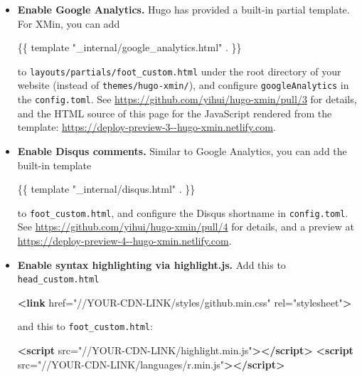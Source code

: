 \documentclass[12pt,]{krantz}
\makeatletter
\newenvironment{Shaded}{\begin{snugshade}}{\end{snugshade}}
\newcommand{\KeywordTok}[1]{\textcolor[rgb]{0.13,0.29,0.53}{\textbf{#1}}}
\newcommand{\StringTok}[1]{\textcolor[rgb]{0.31,0.60,0.02}{#1}}
\newcommand{\OtherTok}[1]{\textcolor[rgb]{0.56,0.35,0.01}{#1}}
\newcommand{\NormalTok}[1]{#1}
\newenvironment{kframe}{%
\medskip{}
\setlength{\fboxsep}{.8em}
 \def\at@end@of@kframe{}%
 \ifinner\ifhmode%
  \def\at@end@of@kframe{\end{minipage}}%
  \begin{minipage}{\columnwidth}%
 \fi\fi%
 \def\FrameCommand##1{\hskip\@totalleftmargin \hskip-\fboxsep
 \colorbox{shadecolor}{##1}\hskip-\fboxsep
     \hskip-\linewidth \hskip-\@totalleftmargin \hskip\columnwidth}%
 \MakeFramed {\advance\hsize-\width
   \@totalleftmargin\z@ \linewidth\hsize
   \@setminipage}}%
 {\par\unskip\endMakeFramed%
 \at@end@of@kframe}
\renewenvironment{Shaded}{\begin{kframe}}{\end{kframe}}
\theoremstyle{definition}
\theoremstyle{definition}
\theoremstyle{definition}
\theoremstyle{remark}
\makeatother
\begin{document}
\begin{itemize}
\item
  \textbf{Enable Google Analytics.} Hugo has
  provided a built-in partial template. For XMin, you can add

\begin{Shaded}
\begin{Highlighting}[]
\NormalTok{\{\{ template "_internal/google_analytics.html" . \}\}}
\end{Highlighting}
\end{Shaded}

  to \texttt{layouts/partials/foot\_custom.html} under the root
  directory of your website (instead of \texttt{themes/hugo-xmin/}), and
  configure \texttt{googleAnalytics} in the \texttt{config.toml}. See
  \url{https://github.com/yihui/hugo-xmin/pull/3} for details, and the
  HTML source of this page for the JavaScript rendered from the
  template: \url{https://deploy-preview-3--hugo-xmin.netlify.com}.
\item
  \textbf{Enable Disqus comments.} Similar to Google
  Analytics, you can add the built-in template

\begin{Shaded}
\begin{Highlighting}[]
\NormalTok{\{\{ template "_internal/disqus.html" . \}\}}
\end{Highlighting}
\end{Shaded}

  to \texttt{foot\_custom.html}, and configure the Disqus shortname in
  \texttt{config.toml}. See
  \url{https://github.com/yihui/hugo-xmin/pull/4} for details, and a
  preview at \url{https://deploy-preview-4--hugo-xmin.netlify.com}.
\item
  \textbf{Enable syntax highlighting via highlight.js.} Add
  this to \texttt{head\_custom.html}

\begin{Shaded}
\begin{Highlighting}[]
\KeywordTok{<link}\OtherTok{ href=}\StringTok{"//YOUR-CDN-LINK/styles/github.min.css"}\OtherTok{ rel=}\StringTok{"stylesheet"}\KeywordTok{>}
\end{Highlighting}
\end{Shaded}

  and this to \texttt{foot\_custom.html}:

\begin{Shaded}
\begin{Highlighting}[]
\KeywordTok{<script}\OtherTok{ src=}\StringTok{"//YOUR-CDN-LINK/highlight.min.js"}\KeywordTok{></script>}
\KeywordTok{<script}\OtherTok{ src=}\StringTok{"//YOUR-CDN-LINK/languages/r.min.js"}\KeywordTok{></script>}


\end{Highlighting}
\end{Shaded}
\end{itemize}
\end{document}

